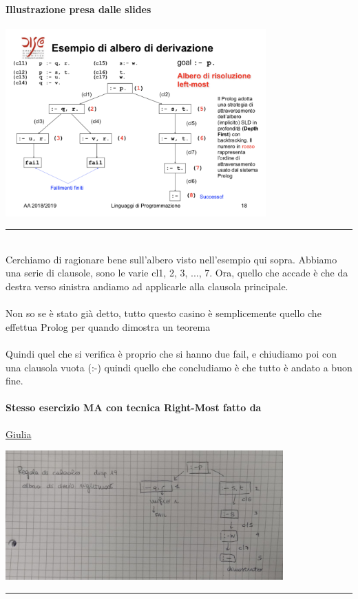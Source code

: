 \documentclass[12pt, a4paper, openany, oneside]{book}
\begin{document}
\paragraph{Illustrazione presa dalle slides}
\begin{center}
\includegraphics[width=0.75\textwidth]{alberoSLD}
\end{center}
{\color{black} \rule{\linewidth}{0.3mm} }
\\
Cerchiamo di ragionare bene sull'albero visto nell'esempio qui sopra. Abbiamo
una serie di clausole, sono le varie cl1, 2, 3, ..., 7. Ora, quello che accade
è che da destra verso sinistra andiamo ad applicarle alla clausola principale.
\\ \\
Non so se è stato già detto, tutto questo casino è semplicemente quello che 
effettua Prolog per quando dimostra un teorema \\ \\
Quindi quel che si verifica è proprio che si hanno due fail, e chiudiamo 
poi con una clausola vuota (:-) quindi quello che concludiamo è che tutto è 
andato a buon fine.
\paragraph{Stesso esercizio MA con tecnica Right-Most fatto da} 
\href{https://github.com/LiaBell47}{Giulia}
\begin{center}
\includegraphics[width=0.80\textwidth]{rightmost}
\end{center}
{\color{black} \rule{\linewidth}{0.3mm}}
\\
\end{document}

